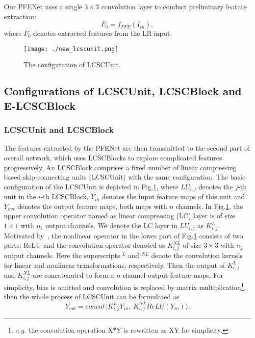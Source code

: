 \documentclass[journal]{IEEEtran}
\begin{document}
Our PFENet uses a single $3\times3$ convolution layer to conduct preliminary feature extraction:
\begin{equation}
F_{0} = f_{PFE}(I_{in}),
\label{con:over_1}
\end{equation}
where $F_{0}$ denotes extracted features from the LR input.



\begin{figure}[htbp]
\centering
\texttt{[image: ./new\_lcscunit.png]}
\caption{\small The configuration of LCSCUnit.}
\label{fig:F4}
\end{figure}

\subsection{Configurations of LCSCUnit, LCSCBlock and E-LCSCBlock}

\subsubsection{LCSCUnit and LCSCBlock}

The features extracted by the PFENet are then transmitted to the second part of overall network, which uses LCSCBlocks to explore complicated features progressively. An LCSCBlock comprises a fixed number of linear compressing based skip-connecting units (LCSCUnit) with the same configuration. The basic configuration of the LCSCUnit is depicted in Fig.\ref{fig:F4}, where $LU_{i,j}$ denotes the $j$-th unit in the $i$-th LCSCBlock, $Y_{in}$ denotes the input feature maps of this unit and $Y_{out}$ denotes the output feature maps, both maps with $n$ channels. In Fig.\ref{fig:F4}, the upper convolution operator named as linear compressing (LC) layer is of size $1\times1$ with $n_{1}$ output channels. We denote the LC layer in $LU_{i,j}$ as $K^{L}_{i,j}$. Motivated by~\cite{he2016identity}, the nonlinear operator in the lower part of Fig.\ref{fig:F4} consists of two parts: ReLU and the convolution operator denoted as $K^{NL}_{i,j}$ of size $3\times3$ with $n_{2}$ output channels. Here the superscripts $^{L}$ and $^{NL}$ denote the convolution kernels for linear and nonlinear transformations, respectively. Then the output of $K^{L}_{i,j}$ and $K^{NL}_{i,j}$ are concatenated to form a $n$-channel output feature maps. For simplicity, bias is omitted and convolution is replaced by matrix multiplication\footnote{\emph{e.g.} the convolution operation X$\ast$Y is rewritten as XY for simplicity.}, then the whole process of LCSCUnit can be formulated as 
\begin{equation}
Y_{out} = concat \big (K^{L}_{i,j}Y_{in}, \ K^{NL}_{i,j}ReLU(Y_{in}) \big ).
\label{eq:lcscunit}
\end{equation}
\end{document}
